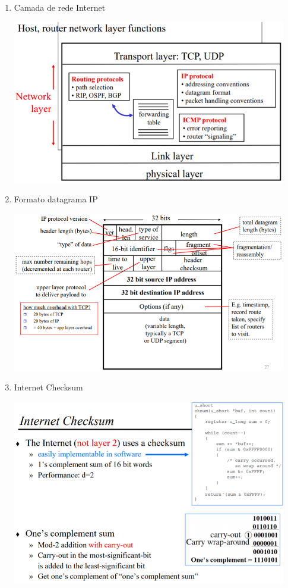 \documentclass[../resumosRCOM.tex]{subfiles}
\begin{document}
\begin{enumerate}
    \item Camada de rede Internet
        \begin{center}
            \includegraphics[width=12cm]{images/RCOM11.png}
        \end{center}
    \item Formato datagrama IP
        \begin{center}
            \includegraphics[width=12cm]{images/RCOM12.png}
        \end{center}
    \item Internet Checksum
        \begin{center}
            \includegraphics[width=12cm]{images/RCOM13.png}
        \end{center}
\end{enumerate}
\end{document}
